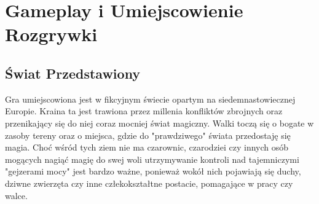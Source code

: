 \documentclass[a4paper]{scrreprt}
\begin{document}
\chapter{Gameplay i Umiejscowienie Rozgrywki}



\section{Świat Przedstawiony}
Gra umiejscowiona jest w fikcyjnym świecie opartym na siedemnastowiecznej Europie. Kraina ta jest trawiona przez millenia konfliktów zbrojnych oraz przenikający się do niej coraz mocniej świat magiczny. Walki toczą się o bogate w zasoby tereny oraz o miejsca, gdzie do "prawdziwego" świata przedostaję się magia. Choć wśród tych ziem nie ma czarownic, czarodziei czy innych osób mogących nagiąć magię do swej woli utrzymywanie kontroli nad tajemniczymi "gejzerami mocy" jest bardzo ważne, ponieważ wokół nich pojawiają się duchy, dziwne zwierzęta czy inne człekokształtne postacie, pomagające w pracy czy walce.
\end{document}
